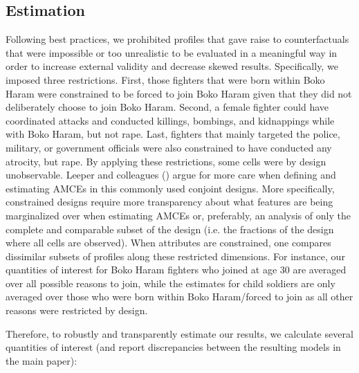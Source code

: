 \subsection{Estimation}
\label{app:C22}
Following best practices, we prohibited profiles that gave raise to counterfactuals that were impossible or too unrealistic to be evaluated in a meaningful way in order to increase external validity and decrease skewed results. Specifically, we imposed three restrictions. First, those fighters that were born within Boko Haram were constrained to be forced to join Boko Haram given that they did not deliberately choose to join Boko Haram. Second, a female fighter could have coordinated attacks and conducted killings, bombings, and kidnappings while with Boko Haram, but not rape. Last, fighters that mainly targeted the police, military, or government officials were also constrained to have conducted any atrocity, but rape. By applying these restrictions, some cells were by design unobservable. Leeper and colleagues (\citeyear{Leeper2019}) argue for more care when defining and estimating AMCEs in this commonly used conjoint designs. More specifically, constrained designs require more transparency about what features are being marginalized over when estimating AMCEs or, preferably, an analysis of only the complete and comparable subset of the design (i.e. the fractions of the design where all cells are observed). When attributes are constrained, one compares dissimilar subsets of profiles along these restricted dimensions. For instance, our quantities of interest for Boko Haram fighters who joined at age 30 are averaged over all possible reasons to join, while the estimates for child soldiers are only averaged over those who were born within Boko Haram/forced to join as all other reasons were restricted by design. 

Therefore, to robustly and transparently estimate our results, we calculate several quantities of interest (and report discrepancies between the resulting models in the main paper): 

